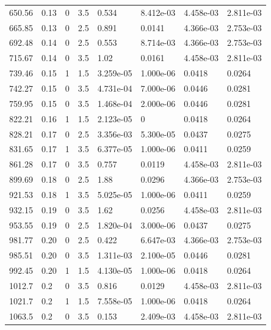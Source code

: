 \documentclass[preview]{standalone}
\begin{document}
{{{\begin{tabular}{L{1.2cm}C{1.2cm} C{0.3cm}C{0.5cm} C{1.4cm}C{1.4cm} C{1.4cm}C{1.4cm}}
  650.56  &  0.13  & 0     & 3.5 &  0.534  & 8.412e-03  & 4.458e-03 &  2.811e-03   \\ 
  665.85  &  0.13  & 0     & 2.5 &  0.891  & 0.0141  & 4.366e-03 &  2.753e-03   \\ 
  692.48  &  0.14  & 0     & 2.5 &  0.553  & 8.714e-03  & 4.366e-03 &  2.753e-03   \\ 
  715.67  &  0.14  & 0     & 3.5 &  1.02  & 0.0161  & 4.458e-03 &  2.811e-03   \\ 
  739.46  &  0.15  & 1     & 1.5 &  3.259e-05  & 1.000e-06  & 0.0418 &  0.0264   \\ 
  742.27  &  0.15  & 0     & 3.5 &  4.731e-04  & 7.000e-06  & 0.0446 &  0.0281   \\ 
  759.95  &  0.15  & 0     & 3.5 &  1.468e-04  & 2.000e-06  & 0.0446 &  0.0281   \\ 
  822.21  &  0.16  & 1     & 1.5 &  2.123e-05  & 0  & 0.0418 &  0.0264   \\ 
  828.21  &  0.17  & 0     & 2.5 &  3.356e-03  & 5.300e-05  & 0.0437 &  0.0275   \\ 
  831.65  &  0.17  & 1     & 3.5 &  6.377e-05  & 1.000e-06  & 0.0411 &  0.0259   \\ 
  861.28  &  0.17  & 0     & 3.5 &  0.757  & 0.0119  & 4.458e-03 &  2.811e-03   \\ 
  899.69  &  0.18  & 0     & 2.5 &  1.88  & 0.0296  & 4.366e-03 &  2.753e-03   \\ 
  921.53  &  0.18  & 1     & 3.5 &  5.025e-05  & 1.000e-06  & 0.0411 &  0.0259   \\ 
  932.15  &  0.19  & 0     & 3.5 &  1.62  & 0.0256  & 4.458e-03 &  2.811e-03   \\ 
  953.55  &  0.19  & 0     & 2.5 &  1.820e-04  & 3.000e-06  & 0.0437 &  0.0275   \\ 
  981.77  &  0.20  & 0     & 2.5 &  0.422  & 6.647e-03  & 4.366e-03 &  2.753e-03   \\ 
  985.51  &  0.20  & 0     & 3.5 &  1.311e-03  & 2.100e-05  & 0.0446 &  0.0281   \\ 
  992.45  &  0.20  & 1     & 1.5 &  4.130e-05  & 1.000e-06  & 0.0418 &  0.0264   \\ 
  1012.7  &   0.2  & 0     & 3.5 &  0.816  & 0.0129  & 4.458e-03 &  2.811e-03   \\ 
  1021.7  &   0.2  & 1     & 1.5 &  7.558e-05  & 1.000e-06  & 0.0418 &  0.0264   \\ 
  1063.5  &   0.2  & 0     & 3.5 &  0.153  & 2.409e-03  & 4.458e-03 &  2.811e-03   \\ 

\end{tabular}}}}
\end{document}
